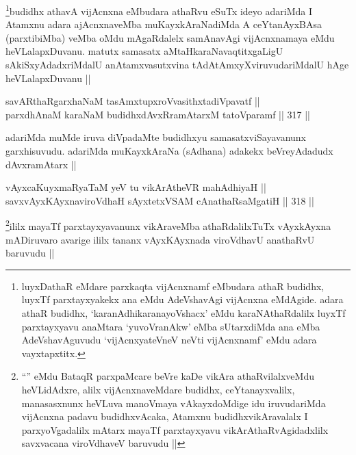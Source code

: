 \begin{artha}
\footnote{luyxDathaR eMdare parxkaqta vijAcnxnamf eMbudara athaR budidhx, luyxTf parxtayxyakekx ana eMdu AdeVshavAgi vijAcnxna eMdAgide. adara athaR budidhx, `karanAdhikaranayoVshacx' eMdu karaNAthaRdalilx luyxTf parxtayxyavu anaMtara `yuvoVranAkw' eMba sUtarxdiMda ana eMba AdeVshavAguvudu `vijAcnxyateV\s neV neVti vijAcnxnamf' eMdu adara vayxtapxtitx.}budidhx athavA vijAcnxna eMbudara athaRvu eSuTx ideyo adariMda I Atamxnu adara ajAcnxnaveMba muKayxkAraNadiMda A ceYtanAyxBAsa (parxtibiMba) veMba oMdu mAgaRdalelx samAnavAgi vijAcnxnamaya eMdu heVLalapxDuvanu. matutx samasatx aMtaHkaraNavaqtitxgaLigU sAkiSxyAdadxriMdalU anAtamxvasutxvina tAdAtAmxyXviruvudariMdalU hAge heVLalapxDuvanu ||
\end{artha}


\begin{shl}
savARthaRgarxhaNaM tasAmxtupxroVvasithxtadiVpavatf || \\
parxdhAnaM karaNaM budidhxdAvxRramAtarxM tatoV\s paramf ||  317 || 
\end{shl}

\begin{artha}
adariMda muMde iruva diVpadaMte budidhxyu samasatxviSayavanunx garxhisuvudu. adariMda muKayxkAraNa (sAdhana) adakekx beVreyAdadudx dAvxramAtarx ||
\end{artha}


\begin{shl}
vAyxcaKuyxmaRyaTaM yeV tu vikArAtheVR mahAdhiyaH ||  \\
savxvAyxKAyxnaviroVdhaH sAyxtetxVSAM cAnathaRsaMgatiH ||  318 ||  
\end{shl}

\begin{artha}
\footnote{``\stext'' eMdu BataqR parxpaMcare beVre kaDe vikAra athaRvilalxveMdu heVLidAdxre, alilx vijAcnxnaveMdare budidhx, ceYtanayxvalilx, manasasxnunx heVLuva manoVmaya vAkayxdoMdige idu iruvudariMda vijAcnxna padavu budidhxvAcaka, Atamxnu budidhxvikAravalalx I parxyoVgadalilx mAtarx mayaTf parxtayxyavu vikArAthaRvAgidadxlilx savxvacana viroVdhaveV baruvudu ||}ililx mayaTf parxtayxyavanunx vikAraveMba athaRdalilxTuTx vAyxkAyxna mADiruvaro avarige ililx tananx vAyxKAyxnada viroVdhavU anathaRvU baruvudu ||
\end{artha}


